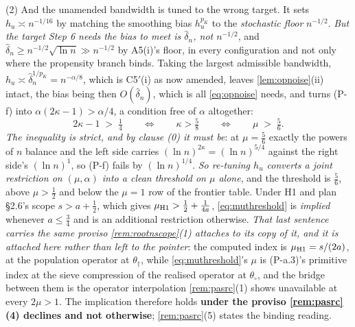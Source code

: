 \begin{remark}
(2) And the unamended bandwidth is tuned to the wrong target. It sets
$h_u\asymp n^{-1/16}$ by matching the smoothing bias $h_u^{p_K}$ to the \emph{stochastic floor}
$n^{-1/2}$. \emph{But the target Step 6 needs the bias to meet is $\hat\delta_n$, not $n^{-1/2}$}, and
$\hat\delta_n\ge n^{-1/2}\sqrt{\ln n}\gg n^{-1/2}$ by A5(i)'s floor, in every configuration and not
only where the propensity branch binds. Taking the largest
admissible bandwidth, $h_u\asymp\hat\delta_n^{1/p_K}=n^{-\alpha/8}$, which is C5$'$(i) as now
amended, leaves \cref{lem:opnoise}(ii) intact, the bias being then $O(\hat\delta_n)$, which is all
\eqref{eq:opnoise} needs, and turns (P-f) into $\alpha(2\kappa-1)>\alpha/4$, a condition free of
$\alpha$ altogether:
\begin{equation}\label{eq:muthreshold}
2\kappa-1\;>\;\tfrac14
\qquad\Longleftrightarrow\qquad
\kappa>\tfrac58
\qquad\Longleftrightarrow\qquad
\mu\;>\;\tfrac56 .
\end{equation}
\emph{The inequality is strict, and by clause (0) it must be}: at $\mu=\tfrac56$ exactly the powers of
$n$ balance and the left side carries $(\ln n)^{2\kappa}=(\ln n)^{5/4}$ against the right side's
$(\ln n)^{1}$, so (P-f) fails by $(\ln n)^{1/4}$. \emph{So re-tuning $h_u$ converts a joint restriction
on $(\mu,\alpha)$ into a clean threshold on $\mu$ alone}, and the threshold is $\tfrac56$, above
$\mu>\tfrac12$ and below the $\mu=1$ row of the frontier table. Under H1 and plan \S2.6's scope
$s>a+\tfrac12$, which gives $\mu_{\text{\textup{H1}}}>\tfrac12+\tfrac1{4a}$, \eqref{eq:muthreshold}
is \emph{implied}
whenever $a\le\tfrac34$ and is an additional restriction otherwise. \emph{That last sentence carries
the same proviso \cref{rem:rootnscope}\textup{(1)} attaches to its copy of it, and it is attached
here rather than left to the pointer}: the computed index is $\mu_{\text{\textup{H1}}}=s/(2a)$, at
the population operator at $\theta_\dagger$, while \eqref{eq:muthreshold}'s $\mu$ is (P-a.3)'s
primitive index at the sieve compression of the realised operator at $\theta_\circ$, and the bridge
between them is the operator interpolation \cref{rem:pasrc}\textup{(1)} shows unavailable at every
$2\mu>1$. The implication therefore holds \textbf{under the proviso \cref{rem:pasrc}\textup{(4)}
declines and not otherwise}; \cref{rem:pasrc}\textup{(5)} states the binding reading.


\end{remark}
